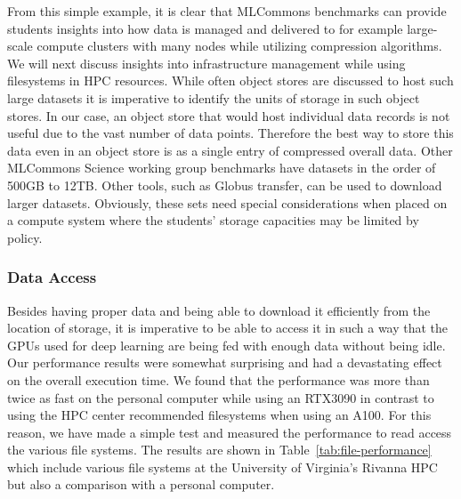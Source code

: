 \documentclass[utf8]{FrontiersinVancouver} %
\begin{document}
From this simple example, it is clear that MLCommons benchmarks can
provide students insights into how data is managed and delivered to for example
large-scale compute clusters with many nodes while utilizing
compression algorithms. We will next discuss insights into
infrastructure management while using filesystems in HPC resources.
While often object stores are discussed to host such large datasets it
is imperative to identify the units of storage in such object stores.
In our case, an object store that would host individual data records
is not useful due to the vast number of data points. Therefore the
best way to store this data even in an object store is as a single
entry of compressed overall data.  Other MLCommons Science working
group benchmarks have datasets in the order of 500GB to
12TB. Other tools, such as Globus transfer, can be used to download larger datasets.
Obviously, these sets need special considerations when placed on a
compute system where the students' storage capacities may be limited by
policy.


\subsubsection{Data Access}

Besides having proper data and being able to download it efficiently
from the location of storage, it is imperative to be able to access it
in such a way that the GPUs used for deep learning are being fed with
enough data without being idle. Our performance results were somewhat
surprising and had a devastating effect on the overall execution time. We found 
that the performance was more than twice as fast on the personal computer while using an RTX3090
in contrast to using the HPC center recommended filesystems when using
an A100. For this reason, we have made a simple test and measured the
performance to read access the various file systems. The results are
shown in Table~\ref{tab:file-performance} which include various file
systems at the University of Virginia's Rivanna HPC but also a
comparison with a personal computer.
\end{document}
